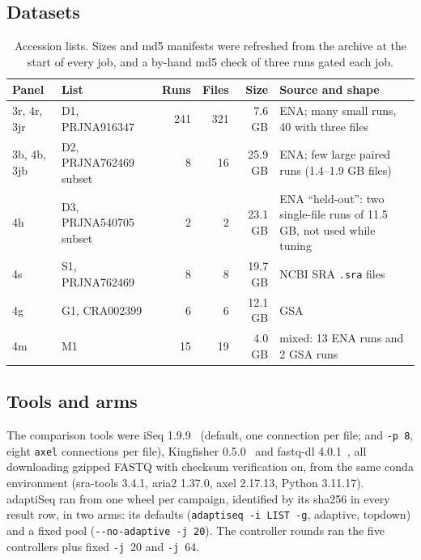\documentclass[11pt,a4paper]{article}
\newcommand{\code}[1]{\texttt{#1}}
\begin{document}
\subsection{Datasets}
\begin{table}[h]
\centering\small
\begin{tabularx}{\linewidth}{@{}llrrrX@{}}
\toprule
Panel & List & Runs & Files & Size & Source and shape \\
\midrule
3r, 4r, 3jr & D1, PRJNA916347 & 241 & 321 & 7.6 GB & ENA; many small runs, 40 with three files \\
3b, 4b, 3jb & D2, PRJNA762469 subset & 8 & 16 & 25.9 GB & ENA; few large paired runs (1.4--1.9 GB files) \\
4h & D3, PRJNA540705 subset & 2 & 2 & 23.1 GB & ENA ``held-out'': two single-file runs of 11.5 GB, not used while tuning \\
4s & S1, PRJNA762469 & 8 & 8 & 19.7 GB & NCBI SRA \code{.sra} files \\
4g & G1, CRA002399 & 6 & 6 & 12.1 GB & GSA \\
4m & M1 & 15 & 19 & 4.0 GB & mixed: 13 ENA runs and 2 GSA runs \\
\bottomrule
\end{tabularx}
\caption{Accession lists. Sizes and md5 manifests were refreshed from the archive at the start of every job, and a
by-hand md5 check of three runs gated each job.}
\label{tab:data}
\end{table}

\subsection{Tools and arms}
The comparison tools were iSeq 1.9.9~\cite{iseq} (default, one connection per file; and \code{-p 8}, eight \code{axel}
connections per file), Kingfisher 0.5.0~\cite{kingfisher} and fastq-dl 4.0.1~\cite{fastqdl}, all downloading gzipped FASTQ
with checksum verification on, from the same conda environment (sra-tools 3.4.1, aria2 1.37.0, axel 2.17.13, Python
3.11.17). adaptiSeq ran from one wheel per campaign, identified by its sha256 in every result row, in two arms: its
defaults (\code{adaptiseq -i LIST -g}, adaptive, topdown) and a fixed pool (\code{-{}-no-adaptive -j 20}). The controller
rounds ran the five controllers plus fixed \code{-j}~20 and \code{-j}~64.
\end{document}
